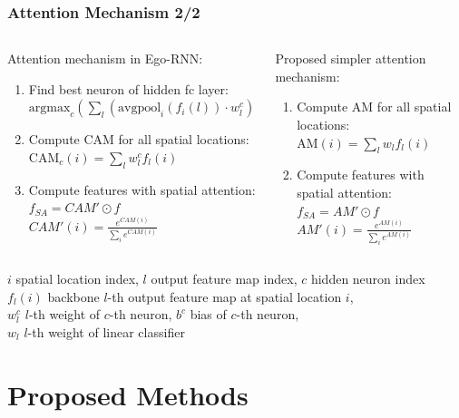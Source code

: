 \documentclass{beamer}
\begin{document}
\begin{frame}
\frametitle{Attention Mechanism 2/2}

\begin{columns}[t]
	\begin{column}{0.5\textwidth}
		Attention mechanism in Ego-RNN:
		\vspace{6pt}
		{ \scriptsize
		\begin{enumerate}
			\item Find best neuron of hidden fc layer:
			${{\text{argmax}}_c (\sum_l(\text{avgpool}_i(f_i(l)) \cdot w_l^c) + b^c )}$
			\item Compute CAM for all spatial locations: 
			${\text{CAM}_c(i) = \sum_l w_l^c f_l(i)}$
			\item Compute features with spatial attention: \\
			$f_{SA} = CAM' \odot f $ \\ $CAM'(i) =  \frac{e^{CAM(i)}}{\sum_i e^{CAM(i)}}$
		\end{enumerate}
		}
	\end{column} %
	\begin{column}{0.5\textwidth}
		Proposed simpler attention mechanism:
		\vspace{6pt}
		{ \scriptsize
			\begin{enumerate}
				\item Compute AM for all spatial locations: 
				${\text{AM}(i) = \sum_l w_l f_l(i)}$
				\item Compute features with spatial attention: \\
				$f_{SA} = AM' \odot f $ \\ $ AM'(i) =  \frac{e^{AM(i)}}{\sum_i e^{AM(i)}}$
			\end{enumerate}
		}
	\end{column}
\end{columns}

\vfill

{\scriptsize $i$ spatial location index, $l$ output feature map index, $c$ hidden neuron index \\ 
$f_l(i)$ backbone $l$-th output feature map at spatial location $i$, \\
$w_l^c$ $l$-th weight of $c$-th neuron, $b^c$ bias of $c$-th neuron, \\  
\vspace{-4pt}
$w_l$ $l$-th weight of linear classifier}


\end{frame}

\section{Proposed Methods}
\end{document}
